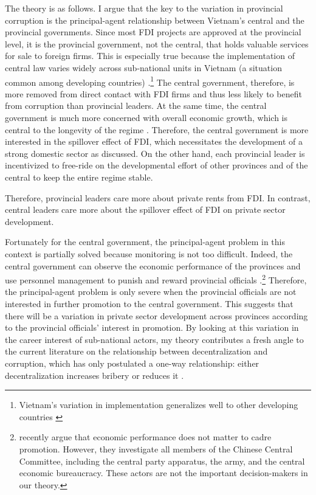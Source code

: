 The theory is as follows. I argue that the key to the variation in provincial corruption is the principal-agent relationship between Vietnam's central and the provincial governments. Since most FDI projects are approved at the provincial level, it is the provincial government, not the central, that holds valuable services for sale to foreign firms. This is especially true because the implementation of central law varies widely across sub-national units in Vietnam (a situation common among developing countries) \citep{Meyer2005}.\footnote{Vietnam's variation in implementation generalizes well to other developing countries \citep{Thun2006}} The central government, therefore, is more removed from direct contact with FDI firms and thus less likely to benefit from corruption than provincial leaders. At the same time, the central government is much more concerned with overall economic growth, which is central to the longevity of the regime \citep{Malesky2008}. Therefore, the central government is more interested in the spillover effect of FDI, which necessitates the development of a strong domestic sector as discussed.  On the other hand, each provincial leader is incentivized to free-ride on the developmental effort of other provinces and of the central to keep the entire regime stable. 

Therefore, provincial leaders care more about private rents from FDI. In contrast, central leaders care more about the spillover effect of FDI on private sector development.

Fortunately for the central government, the principal-agent problem in this context is partially solved because monitoring is not too difficult. Indeed, the central government can observe the economic performance of the provinces and use personnel management to punish and reward provincial officials \citep{Sheng2007, Li2005}.\footnote{\citet{Shih2012} recently argue that economic performance does not matter to cadre promotion. However, they investigate all members of the Chinese Central Committee, including the central party apparatus, the army, and the central economic bureaucracy. These actors are not the important decision-makers in our theory.} Therefore, the principal-agent problem is only severe when the provincial officials are not interested in further promotion to the central government. This suggests that there will be a variation in private sector development across provinces according to the provincial officials' interest in promotion. By looking at this variation in the career interest of sub-national actors, my theory contributes a fresh angle to the current literature on the relationship between decentralization and corruption, which has only postulated a one-way relationship: either decentralization increases bribery \citep{Fan2009} or reduces it \citep{Guerra2009}.

